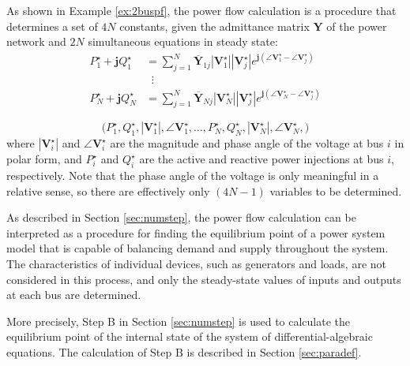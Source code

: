 \documentclass[graybox, envcountchap]{svmult}
\begin{document}
As shown in Example \ref{ex:2buspf}, the power flow calculation is a procedure
that determines a set of $4N$ constants, given the admittance matrix $\bm{Y}$ of
the power network and $2N$ simultaneous equations in steady state:
\begin{equation}\label{eq:PQVgenst}
  \begin{aligned}
    P_1^{\star} + \bm{j} Q_1^{\star} &= 
    \sum_{j=1}^{N} \overline{\bm{Y}}_{1j} |\bm{V}_1^{\star}| |\bm{V}_j^{\star} | e^{\bm{j} (\angle \bm{V}_1^{\star} - \angle \bm{V}_j^{\star} )} \\ 
    & \; \;  \vdots \\
    P_N^{\star} + \bm{j} Q_N^{\star} &= 
    \sum_{j=1}^{N} \overline{\bm{Y}}_{Nj} |\bm{V}_N^{\star}| |\bm{V}_j^{\star} | e^{\bm{j} (\angle \bm{V}_N^{\star} - \angle \bm{V}_j^{\star} )}
  \end{aligned}
\end{equation}

\begin{equation}\label{eq:pfconst}
  \bigl(
    P_1^{\star},Q_1^{\star},|\bm{V}_1^{\star}|,\angle \bm{V}_1^{\star},
    \ldots,
    P_N^{\star},Q_N^{\star},|\bm{V}_N^{\star}|,\angle \bm{V}_N^{\star},
  \bigr)
\end{equation}
where $|\bm{V}_i^{\star}|$ and $\angle \bm{V}_i^{\star}$ are the magnitude and
phase angle of the voltage at bus $i$ in polar form, and $P_i^{\star}$ and
$Q_i^{\star}$ are the active and reactive power injections at bus $i$,
respectively. Note that the phase angle of the voltage is only meaningful in a
relative sense, so there are effectively only $(4N-1)$ variables to be
determined.

As described in Section \ref{sec:numstep}, the power flow calculation can be
interpreted as a procedure for finding the equilibrium point of a power system
model that is capable of balancing demand and supply throughout the system. The
characteristics of individual devices, such as generators and loads, are not
considered in this process, and only the steady-state values of inputs and
outputs at each bus are determined.

More precisely, Step B in Section \ref{sec:numstep} is used to calculate the
equilibrium point of the internal state of the system of differential-algebraic
equations. The calculation of Step B is described in Section \ref{sec:paradef}.

\end{document}
